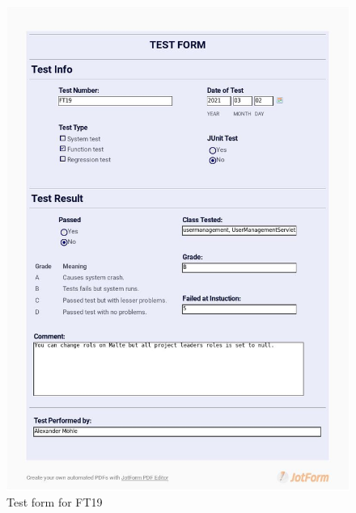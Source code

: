 \documentclass{article}
\begin{document}
 \begin{figure}
     \centering
     \includegraphics[width=13cm]{images/2021-03-02_Alexander_FT19_001}
     \renewcommand\figurename{Figure}
     \caption{Test form for FT19}
     \label{fig:my_label}
 \end{figure}
 
\end{document}
